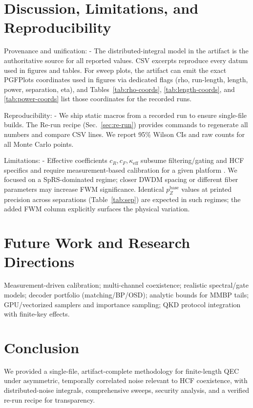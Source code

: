 \documentclass{article}
\begin{document}
\section{Discussion, Limitations, and Reproducibility}\label{sec:discussion}
Provenance and unification:
- The distributed-integral model in the artifact is the authoritative source for all reported values. CSV excerpts reproduce every datum used in figures and tables. For sweep plots, the artifact can emit the exact PGFPlots coordinates used in figures via dedicated flags (rho, run-length, length, power, separation, eta), and Tables~\ref{tab:rho-coords}, \ref{tab:length-coords}, and \ref{tab:power-coords} list those coordinates for the recorded runs.

Reproducibility:
- We ship static macros from a recorded run to ensure single-file builds. The Re-run recipe (Sec.~\ref{sec:re-run}) provides commands to regenerate all numbers and compare CSV lines. We report 95\% Wilson CIs and raw counts for all Monte Carlo points.

Limitations:
- Effective coefficients \(c_R,c_F,\kappa_{\mathrm{eff}}\) subsume filtering/gating and HCF specifics and require measurement-based calibration for a given platform \cite{AgrawalNFO,Patel2012PRX,Kumar2015NJP}. We focused on a SpRS-dominated regime; closer DWDM spacing or different fiber parameters may increase FWM significance. Identical \(p_Z^{\text{base}}\) values at printed precision across separations (Table~\ref{tab:sep}) are expected in such regimes; the added FWM column explicitly surfaces the physical variation.

\section{Future Work and Research Directions}\label{sec:future}
Measurement-driven calibration; multi-channel coexistence; realistic spectral/gate models; decoder portfolio (matching/BP/OSD); analytic bounds for MMBP tails; GPU/vectorized samplers and importance sampling; QKD protocol integration with finite-key effects.

\section{Conclusion}
We provided a single-file, artifact-complete methodology for finite-length QEC under asymmetric, temporally correlated noise relevant to HCF coexistence, with distributed-noise integrals, comprehensive sweeps, security analysis, and a verified re-run recipe for transparency.
\end{document}
